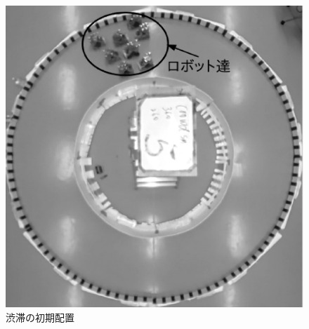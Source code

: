 \begin{figure}[h]
\begin{minipage}{0.49\linewidth}
        \includegraphics[width=1.0\linewidth]{start_crowd.eps}
        \caption{渋滞の初期配置}
        \label{crowdstart}
    \end{minipage}
\end{figure}
